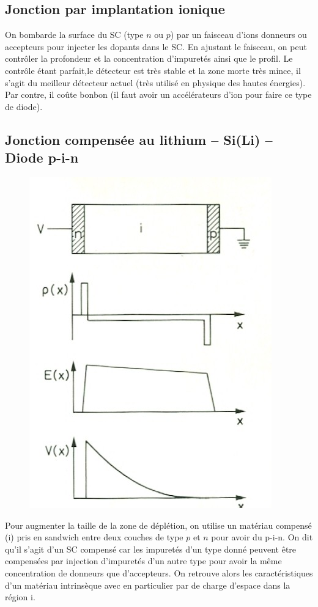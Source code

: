 \subsection{Jonction par implantation ionique}
On bombarde la surface du SC (type $n$ ou $p$) par un faisceau d'ions donneurs ou accepteurs 
pour injecter les dopants dans le SC. En ajustant le faisceau, on peut contrôler la 
profondeur et la concentration d'impuretés ainsi que le profil. Le contrôle étant parfait,le 
détecteur est très stable et la zone morte très mince, il s'agit du meilleur détecteur actuel 
(très utilisé en physique des hautes énergies). Par contre, il coûte bonbon (il faut avoir un
accélérateurs d'ion pour faire ce type de diode).

\subsection{Jonction compensée au lithium – Si(Li) – Diode p-i-n}
	\begin{figure}
	\vspace{-5mm}
	\includegraphics[scale=0.27]{ch9/image4}
	\end{figure}
	
Pour augmenter la taille de la zone de déplétion, on utilise un matériau compensé (i) pris en
sandwich entre deux couches de type $p$ et $n$ pour avoir du p-i-n. On dit qu'il s'agit d'un
SC compensé car les impuretés d'un type donné peuvent être compensées par injection d'impuretés
d'un autre type pour avoir la même concentration de donneurs que d'accepteurs. On retrouve alors
les caractéristiques d'un matériau intrinsèque avec en particulier par de charge d'espace dans la
région i.\\

